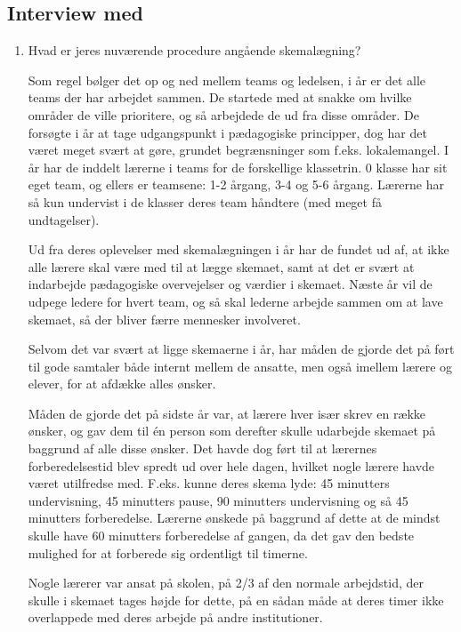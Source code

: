 \subsection{Interview med \school}
\label{InterviewKaerby}
\begin{enumerate}
	\item Hvad er jeres nuværende procedure angående skemalægning?

	Som regel bølger det op og ned mellem teams og ledelsen, i år er det alle teams der har arbejdet sammen. De startede med at snakke om hvilke områder de ville prioritere, og så arbejdede de ud fra disse områder. De forsøgte i år at tage udgangspunkt i pædagogiske principper, dog har det været meget svært at gøre, grundet begrænsninger som f.eks. lokalemangel. I år har de inddelt lærerne i teams for de forskellige klassetrin. 0 klasse har sit eget team, og ellers er teamsene: 1-2 årgang, 3-4 og 5-6 årgang. Lærerne har så kun undervist i de klasser deres team håndtere (med meget få undtagelser).

	Ud fra deres oplevelser med skemalægningen i år har de fundet ud af, at ikke alle lærere skal være med til at lægge skemaet, samt at det er svært at indarbejde pædagogiske overvejelser og værdier i skemaet. Næste år vil de udpege ledere for hvert team, og så skal lederne arbejde sammen om at lave skemaet, så der bliver færre mennesker involveret.

	Selvom det var svært at ligge skemaerne i år, har måden de gjorde det på ført til gode samtaler både internt mellem de ansatte, men også imellem lærere og elever, for at afdække alles ønsker.

	Måden de gjorde det på sidste år var, at lærere hver især skrev en række ønsker, og gav dem til \'en person som derefter skulle udarbejde skemaet på baggrund af alle disse ønsker. Det havde dog ført til at lærernes forberedelsestid blev spredt ud over hele dagen, hvilket nogle lærere havde været utilfredse med. F.eks. kunne deres skema lyde: 45 minutters undervisning, 45 minutters pause, 90 minutters undervisning og så 45 minutters forberedelse. Lærerne ønskede på baggrund af dette at de mindst skulle have 60 minutters forberedelse af gangen, da det gav den bedste mulighed for at forberede sig ordentligt til timerne.

	Nogle lærerer var ansat på skolen, på 2/3 af den normale arbejdstid, der skulle i skemaet tages højde for dette, på en sådan måde at deres timer ikke overlappede med deres arbejde på andre institutioner.


\end{enumerate}
